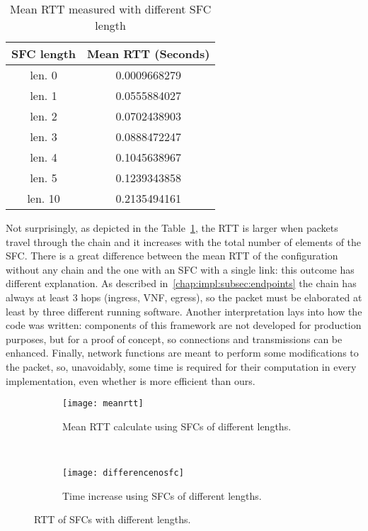 \begin{table}[H]
\centering
\begin{tabular}{@{}cc@{}}
\toprule
\textbf{SFC length} & \textbf{Mean RTT (Seconds)} \\ \midrule
len. 0              & 0.0009668279      \\
len. 1              & 0.0555884027      \\
len. 2              & 0.0702438903      \\
len. 3              & 0.0888472247      \\
len. 4              & 0.1045638967      \\
len. 5              & 0.1239343858      \\
len. 10             & 0.2135494161      \\ \bottomrule
\end{tabular}
\caption{Mean RTT measured with different SFC length}
\label{chap:tests:sec:rtt:tab:meanrtt}
\end{table}

\noindent
Not surprisingly, as depicted in the Table~\ref{chap:tests:sec:rtt:tab:meanrtt},
the RTT is larger when packets travel through the chain and it increases with
the total number of elements of the SFC. There is a great difference between
the mean RTT of the configuration without any chain and the one with an SFC
with a single link: this outcome has different explanation. As
described in~\ref{chap:impl:subsec:endpoints} the chain has always at
least 3 hops (ingress, VNF, egress), so the packet must be elaborated at least
by three different running software. Another interpretation lays into how the
code was written: components of this framework are not developed for production
purposes, but for a proof of concept, so connections and transmissions can be
enhanced. Finally, network functions are meant to perform some modifications to
the packet, so, unavoidably, some time is required for their computation in
every implementation, even whether is more efficient than ours.

\begin{figure}[H]
    \begin{subfigure}[b]{0.45\textwidth}
        \texttt{[image: meanrtt]}
        \caption{Mean RTT calculate using SFCs of different lengths.}
        \label{chap:tests:sec:rtt:img:meanstt}
    \end{subfigure}
    ~
    \begin{subfigure}[b]{0.45\textwidth}
        \texttt{[image: differencenosfc]}
        \caption{Time increase using SFCs of different lengths.}
        \label{chap:tests:sec:rtt:img:differencertt}
    \end{subfigure}
    \caption{RTT of SFCs with different lengths.}
\end{figure}

